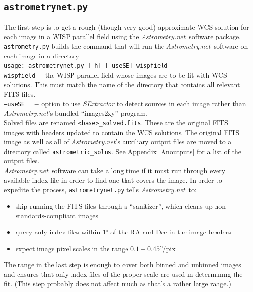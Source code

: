 \documentclass{article}
\newlength{\wideitemsep}
\let\olditem\item
\renewcommand{\item}{\setlength{\itemsep}{\wideitemsep}\olditem}
\newcommand{\An}{\textit{Astrometry.net}}
\begin{document}
\subsection{\texttt{astrometrynet.py}}
The first step is to get a rough (though very good) approximate WCS 
solution for each image in a WISP parallel field using the \An~software 
package. \texttt{astrometry.py} builds the command that will
run the \An~software on each image in a directory. \\

\texttt{usage: astrometrynet.py [-h] [--useSE] wispfield} \\

\texttt{wispfield} $-$ \hangindent=2.7cm the WISP parallel field whose images
are to be fit with WCS solutions. This must match the name of the directory that
contains all relevant FITS files.\\

\texttt{--useSE} ~~$-$ \hangindent=2.7cm option to use \textit{SExtractor} 
to detect sources in each image rather than \An's bundled ``images2xy'' 
program. \\

\noindent Solved files are renamed \texttt{<base>\_solved.fits}. These 
are the original FITS images with headers updated to contain the WCS
solutions. 
The original FITS image as well as all of \An's auxiliary
output files are moved to a directory called \texttt{astrometric\_solns}.
See Appendix \ref{Anoutputs} for a list of the output files. \\

\noindent \An~software can take a long time if it must run 
through every available index file in order to find one that covers the
image. In order to expedite the process, \texttt{astrometrynet.py} tells \An~to:
\begin{itemize}
    \item skip running the FITS files through a ``sanitizer'', which cleans up
    non-standards-compliant images
    \item query only index files within 1$^{\circ}$ of the RA and Dec in the 
    image headers
    \item expect image pixel scales in the range $0.1 - 0.45$''/pix 
\end{itemize}
The range in the last step is enough to cover both binned and unbinned images
and ensures that only index files of the proper scale are used in 
determining the fit. (This step probably does not affect much as
that's a rather large range.) \\
\end{document}
